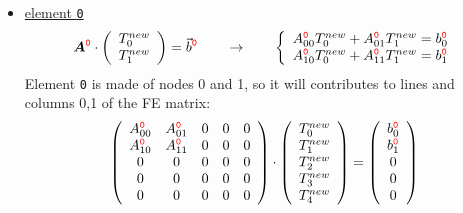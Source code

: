 \begin{itemize}
\item \underline{element {\color{red}\tt 0}}
\[
{\bm A}^{\color{red} \tt 0}  \cdot 
\left(
\begin{array}{c}
T_0^{new} \\ T_1^{new}
\end{array}
\right)
 =  {\vec b}^{\color{red} \tt 0}
\qquad
\rightarrow
\qquad
\left\{ 
\begin{array}{l}
A_{00}^{{\color{red}\tt 0}} T_0^{new} + A_{01}^{{\color{red}\tt 0}} T_1^{new} = b^{{\color{red} \tt 0}}_0 \\
A_{10}^{{\color{red}\tt 0}} T_0^{new} + A_{11}^{{\color{red}\tt 0}} T_1^{new} = b^{{\color{red} \tt 0}}_1
\end{array}
\right.
\]
Element {\color{red}\tt 0} is made of nodes 0 and 1, so it will contributes to lines and columns 0,1 of the FE matrix:
\[
\left( \begin{array}{ccccc}
A_{00}^{{\color{red}\tt 0}} &  A_{01}^{{\color{red}\tt 0}} &0&0&0 \\ 
A_{10}^{{\color{red}\tt 0}} &  A_{11}^{{\color{red} \tt 0}}  &0  &0&0 \\
0 & 0 & 0 & 0 & 0 \\ 
0 & 0 & 0 & 0 & 0 \\ 
0 & 0 & 0 & 0 & 0 
\end{array} \right) \cdot
\left(\begin{array}{c}
T_0^{new} \\ T_1^{new} \\ T_2^{new} \\ T_3^{new} \\ T_4^{new}
\end{array} \right)
=
\left(\begin{array}{c}
b_{0}^{{\color{red}\tt 0}} \\  b_{1}^{{\color{red}\tt 0}} \\  0 \\  0 \\ 0
\end{array}\right)
\]






\end{itemize}
